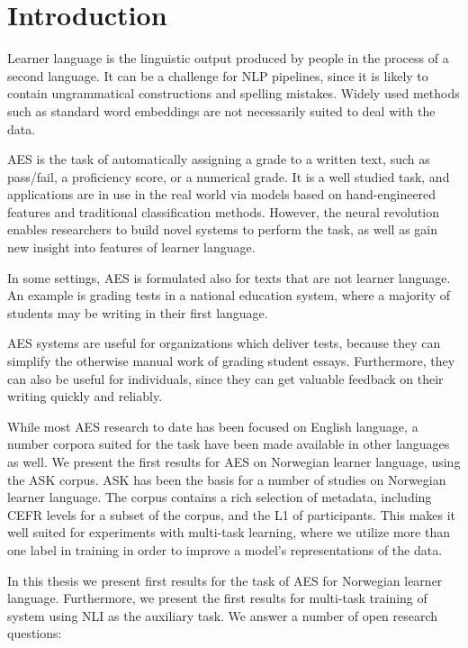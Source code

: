 \chapter{Introduction}

\acresetall

Learner language is the linguistic output produced by people in the process
of a second language. It can be a challenge for \ac{NLP} pipelines, since it
is likely to contain ungrammatical constructions and spelling mistakes.
Widely used methods such as standard word embeddings are not necessarily
suited to deal with the data.

\ac{AES} is the task of automatically assigning a grade to a written text,
such as pass/fail, a proficiency score, or a numerical grade. It is a well
studied task, and applications are in use in the real world via models based
on hand-engineered features and traditional classification methods. However,
the neural revolution enables researchers to build novel systems to perform
the task, as well as gain new insight into features of learner language.

In some settings, \ac{AES} is formulated also for texts that are not learner
language. An example is grading tests in a national education system, where
a majority of students may be writing in their first language.

\ac{AES} systems are useful for organizations which deliver tests, because
they can simplify the otherwise manual work of grading student essays.
Furthermore, they can also be useful for individuals, since they can get
valuable feedback on their writing quickly and reliably.

While most \ac{AES} research to date has been focused on English language, a
number corpora suited for the task have been made available in other
languages as well. We present the first results for \ac{AES} on Norwegian
learner language, using the ASK corpus. ASK has been the basis for a number
of studies on Norwegian learner language. The corpus contains a rich
selection of metadata, including CEFR levels for a subset of the corpus, and
the \ac{L1} of participants. This makes it well suited for experiments with
multi-task learning, where we utilize more than one label in training in
order to improve a model's representations of the data.

In this thesis we present first results for the task of \ac{AES} for
Norwegian learner language. Furthermore, we present the first results for
multi-task training of  system using \ac{NLI} as the auxiliary task.
We answer a number of open research questions:

